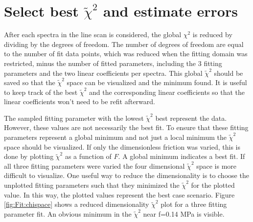 \section*{Select best $\tilde{\chi}^2$ and estimate errors}
After each spectra in the line scan is considered, the global $\chi^2$ is reduced by dividing by the degrees of freedom.
The number of degrees of freedom are equal to the number of fit data points, which was reduced when the fitting domain was restricted, minus the number of fitted parameters, including the 3 fitting parameters and the two linear coefficients per spectra.
This global $\tilde{\chi}^2$ should be saved so that the $\tilde{\chi}^2$ space can be visualized and the minimum found.
It is useful to keep track of the best $\tilde{\chi}^2$ and the corresponding linear coefficients so that the linear coefficients won't need to be refit afterward.

The sampled fitting parameter with the lowest $\tilde{\chi}^2$ best represent the data.
However, these values are not necessarily the best fit.
To ensure that these fitting parameters represent a global minimum and not just a local minimum the $\tilde{\chi}^2$ space should be visualized.
If only the dimensionless friction was varied, this is done by plotting $\tilde{\chi}^2$ as a function of $F$.
A global minimum indicates a best fit.
If all three fitting parameters were varied the four dimensional $\tilde{\chi}^2$ space is more difficult to visualize.
One useful way to reduce the dimensionality is to choose the unplotted fitting parameters such that they minimized the $\tilde{\chi}^2$ for the plotted value.
In this way, the plotted values represent the best case scenario.
Figure \ref{fig:Fit:chispace} shows a reduced dimensionality $\tilde{\chi}^2$ plot for a three fitting parameter fit.
An obvious minimum in the $\tilde{\chi}^2$ near f=0.14 MPa is visible.


